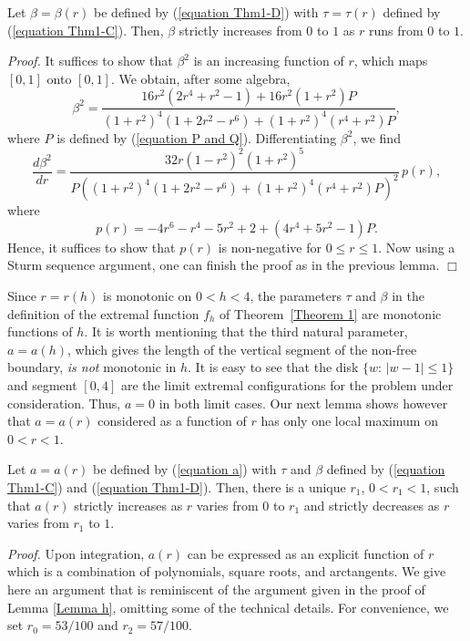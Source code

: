 \documentclass[mn,a4paper,fleqn]{w-art}
\newcommand{\bl}{\begin{lemma}}
\newcommand{\el}{\end{lemma}}
\begin{document}
{\bl  \label{Lemma beta}%
 Let $\beta=\beta(r)$ be defined by (\ref{equation Thm1-D}) with
 $\tau=\tau(r)$ defined by (\ref{equation Thm1-C}).  Then,
$\beta$ strictly increases from $0$ to $1$ as $r$ runs from $0$ to
$1$. %
\el  %

\textit{Proof.}  %
It suffices to show that $\beta^2$ is an increasing function of
$r$, which maps $[0,1]$ onto $[0,1]$.  We obtain, after some
algebra,  %
$$  %
\beta^2 = \frac{16 r^2 (2 r^4 + r^2 - 1) + 16 r^2 (1 + r^2) P}
{(1+r^2)^4 (1  + 2 r^2 - r^6) + (1+r^2)^4 (r^4+r^2)P},  %
$$  %
where $P$ is defined by (\ref{equation P and Q}). Differentiating
$\beta^2$, we find %
$$  %
 \frac{d\beta^2}{dr} = \frac{32 r (1-r^2)^2 (1+r^2)^5 }
{P((1+r^2)^4 (1  + 2 r^2 - r^6) + (1+r^2)^4 (r^4+r^2)P)^2}\,
p(r), %
$$  %
where %
$$  %
p(r) = -4 r^6 - r^4 - 5 r^2 + 2 + (4 r^4 + 5 r^2-1)P.  %
$$  %
 Hence,
it suffices to show that $p(r)$ is non-negative for $0 \le r \le 1$.
Now using a Sturm sequence argument, one can finish the proof
as in the previous lemma.
 \hfill  $\Box$  %



\medskip

Since $r=r(h)$ is monotonic on $0<h<4$, the parameters $\tau$ and
$\beta$ in the definition of the extremal function $f_h$ of
Theorem~\ref{Theorem 1} are monotonic functions of $h$. It is
worth mentioning that the third natural parameter, $a=a(h)$, which
gives the length of the vertical segment of the non-free boundary,
\emph{is not} monotonic in $h$. It is easy to see that the disk
$\{w:\,|w-1|\le 1\}$ and segment $[0,4]$ are the limit extremal
configurations for the problem under consideration. Thus, $a=0$ in
both limit cases. Our next lemma shows however that $a=a(r)$
considered as a function of $r$ has only one local maximum on
$0<r<1$.

\bl  \label{Lemma a}  %
Let $a=a(r)$ be defined by (\ref{equation a}) with $\tau$ and
$\beta$ defined by (\ref{equation Thm1-C}) and (\ref{equation Thm1-D}).
Then, there is a unique $r_1$, $0<r_1<1$, such that $a(r)$
strictly increases as $r$ varies from $0$ to $r_1$  and strictly
decreases as $r$ varies from $r_1$ to $1$.  %
\el  %

\textit{Proof.}
Upon integration, $a(r)$ can be expressed as an explicit function of $r$ which is
a combination of polynomials, square
roots, and arctangents. We give here an argument that is reminiscent of the
argument given in the proof of Lemma \ref{Lemma h}, omitting some of the technical details.
For convenience, we set $r_0 = 53/100$ and $r_2 = 57/100$.

}
\end{document}

